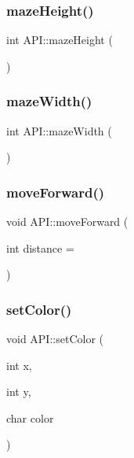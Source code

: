 \mbox{\label{class_a_p_i_ae356a8b8b3090ec8e5e66fb9d7e827a6}} 
\subsubsection{\texorpdfstring{maze\+Height()}{mazeHeight()}}
{\footnotesize\ttfamily int A\+P\+I\+::maze\+Height (\begin{DoxyParamCaption}{ }\end{DoxyParamCaption})\hspace{0.3cm}{\ttfamily [static]}}

\mbox{\label{class_a_p_i_aad4f60e45d012af3985946b3a3bd561c}} 
\subsubsection{\texorpdfstring{maze\+Width()}{mazeWidth()}}
{\footnotesize\ttfamily int A\+P\+I\+::maze\+Width (\begin{DoxyParamCaption}{ }\end{DoxyParamCaption})\hspace{0.3cm}{\ttfamily [static]}}

\mbox{\label{class_a_p_i_a25ace37c644938df32f6dae69abfe052}} 
\subsubsection{\texorpdfstring{move\+Forward()}{moveForward()}}
{\footnotesize\ttfamily void A\+P\+I\+::move\+Forward (\begin{DoxyParamCaption}\item[{int}]{distance = {} }\end{DoxyParamCaption})\hspace{0.3cm}{\ttfamily [static]}}

\mbox{\label{class_a_p_i_aee5aaa673b406ddaab3310fcb3a51d83}} 
\subsubsection{\texorpdfstring{set\+Color()}{setColor()}}
{\footnotesize\ttfamily void A\+P\+I\+::set\+Color (\begin{DoxyParamCaption}\item[{int}]{x,  }\item[{int}]{y,  }\item[{char}]{color }\end{DoxyParamCaption})\hspace{0.3cm}{\ttfamily [static]}}

